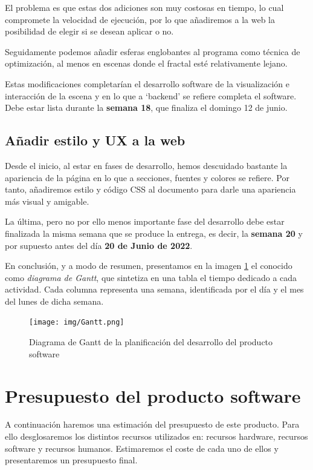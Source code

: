 El problema es que estas dos adiciones son muy costosas en tiempo, lo cual compromete la velocidad de ejecución, por lo que añadiremos a la web la posibilidad de elegir si se desean aplicar o no.

Seguidamente podemos añadir esferas englobantes al programa como técnica de optimización, al menos en escenas donde el fractal esté relativamente lejano.

Estas modificaciones completarían el desarrollo software de la visualización e interacción de la escena y en lo que a `backend' se refiere completa el software. Debe estar lista durante la \textbf{semana 18}, que finaliza el domingo 12 de junio.

\subsection{Añadir estilo y UX a la web}

Desde el inicio, al estar en fases de desarrollo, hemos descuidado bastante la apariencia de la página en lo que a secciones, fuentes y colores se refiere. Por tanto, añadiremos estilo y código CSS al documento para darle una apariencia más visual y amigable.

La última, pero no por ello menos importante fase del desarrollo debe estar finalizada la misma semana que se produce la entrega, es decir, la \textbf{semana 20} y por supuesto antes del día \textbf{20 de Junio de 2022}.

\vspace{0.5cm}

En conclusión, y a modo de resumen, presentamos en la imagen \ref{fig:Gantt} el conocido como \textit{diagrama de Gantt}, que sintetiza en una tabla el tiempo dedicado a cada actividad. Cada columna representa una semana, identificada por el día y el mes del lunes de dicha semana.

\begin{figure} [ht]
    \centering
    \texttt{[image: img/Gantt.png]}
    \caption{Diagrama de Gantt de la planificación del desarrollo del producto software}
    \label{fig:Gantt}
\end{figure}


\section{Presupuesto del producto software}

A continuación haremos una estimación del presupuesto de este producto. Para ello desglosaremos los distintos recursos utilizados en: recursos hardware, recursos software y recursos humanos. Estimaremos el coste de cada uno de ellos y presentaremos un presupuesto final.

